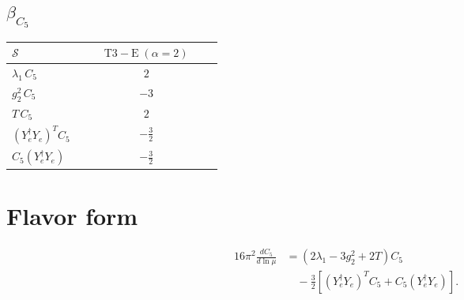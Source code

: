 \documentclass[9pt]{article}
\begin{document}
\subsection*{$ \beta_{C_5} $}
\begin{longtable}{@{}p{0.31\linewidth}c@{}}
\toprule
$\mathcal{S}$ & $ \mathrm{T3-E}\;(\alpha=2) $ \\
\midrule
$ \lambda_1\,C_5 $ & $ 2 $ \\
$ g_2^2\,C_5 $ & $ -3 $ \\
$ T\,C_5 $ & $ 2 $ \\
$ (Y_e^\dagger Y_e)^T C_5 $ & $ - \frac{3}{2} $ \\
$ C_5(Y_e^\dagger Y_e) $ & $ - \frac{3}{2} $ \\
\bottomrule
\end{longtable}
\section*{Flavor form}
\begin{align}
16\pi^2\frac{dC_5}{d\ln\mu}&=(2\lambda_1-3g_2^2+2T)C_5\\
&\quad-\frac32\left[(Y_e^\dagger Y_e)^T C_5+C_5(Y_e^\dagger Y_e)\right].
\end{align}
\end{document}
